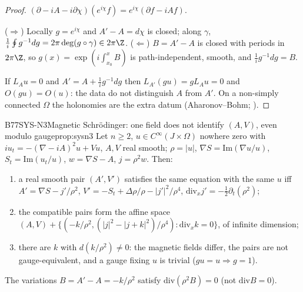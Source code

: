 \begin{proof}
$(\partial-iA-i\partial\chi)(e^{i\chi}f)=e^{i\chi}(\partial f-iAf)$.

($\Rightarrow$) Locally $g=e^{i\chi}$ and $A'-A=d\chi$ is closed; along $\gamma$, $\frac1i\oint g^{-1}dg=2\pi\deg(g\circ\gamma)\in2\pi\Z$. ($\Leftarrow$) $B=A'-A$ is closed with periods in $2\pi\Z$, so $g(x)=\exp(i\int_{x_0}^xB)$ is path-independent, smooth, and $\frac1ig^{-1}dg=B$.

If $L_Au=0$ and $A'=A+\frac1ig^{-1}dg$ then $L_{A'}(gu)=gL_Au=0$ and $O(gu)=O(u)$: the data do not distinguish $A$ from $A'$. On a non-simply connected $\Omega$ the holonomies are the extra datum (Aharonov--Bohm; \cf).

\end{proof}

\begin{dimcard}{B77}{SYS-N3}{Magnetic Schr\"odinger: one field does not identify $(A,V)$, even modulo gauge}{\proved}{prop:sysn3}
Let $n\ge2$, $u\in C^\infty(J\times\Omega)$ nowhere zero with $iu_t=-(\nabla-iA)^2u+Vu$, $A,V$ real smooth; $\rho=|u|$, $\nabla S=\mathrm{Im}(\nabla u/u)$, $S_t=\mathrm{Im}(u_t/u)$, $w=\nabla S-A$, $j=\rho^2w$. Then:
\begin{enumerate}[label=(\alph*)]
\item a real smooth pair $(A',V')$ satisfies the same equation with the same $u$ iff $A'=\nabla S-j'/\rho^2$, $V'=-S_t+\Delta\rho/\rho-|j'|^2/\rho^4$, $\mathrm{div}_xj'=-\tfrac12\partial_t(\rho^2)$;
\item the compatible pairs form the affine space $(A,V)+\{(-k/\rho^2,(|j|^2-|j+k|^2)/\rho^4):\mathrm{div}_xk=0\}$, of infinite dimension;
\item there are $k$ with $d(k/\rho^2)\ne0$: the magnetic fields differ, the pairs are not gauge-equivalent, and a gauge fixing $u$ is trivial ($gu=u\Rightarrow g=1$).
\end{enumerate}
The variations $B=A'-A=-k/\rho^2$ satisfy $\mathrm{div}(\rho^2B)=0$ (not $\mathrm{div}B=0$).
\end{dimcard}

